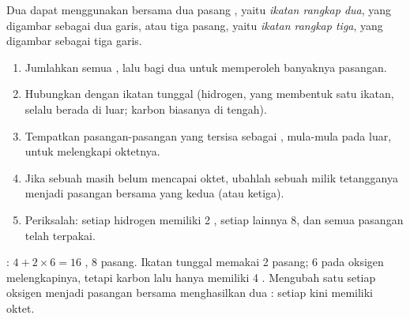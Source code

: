 \begin{definition}\label{def:g10:lewis-and-shape:multiple-bond}
Dua  dapat menggunakan bersama dua pasang , yaitu
\emph{ikatan rangkap dua}, yang digambar
sebagai dua garis, atau tiga pasang, yaitu
\emph{ikatan rangkap tiga}, yang digambar
sebagai tiga garis.
\end{definition}

\begin{method}\label{met:g10:lewis-and-shape:draw}
\begin{enumerate}
  \item Jumlahkan  semua , lalu bagi dua untuk
        memperoleh banyaknya pasangan.
  \item Hubungkan  dengan ikatan tunggal (hidrogen, yang membentuk
        satu ikatan, selalu berada di luar; karbon biasanya di tengah).
  \item Tempatkan pasangan-pasangan yang tersisa sebagai ,
        mula-mula pada  luar, untuk melengkapi oktetnya.
  \item Jika sebuah  masih belum mencapai oktet, ubahlah sebuah
         milik  tetangganya menjadi pasangan bersama
        yang kedua (atau ketiga).
  \item Periksalah: setiap hidrogen memiliki 2 , setiap 
        lainnya 8, dan semua pasangan telah terpakai.
\end{enumerate}
\end{method}

\begin{example}\label{ex:g10:lewis-and-shape:co2}
: $4 + 2 \times 6 = 16$ , 8 pasang. Ikatan
tunggal  memakai 2 pasang; 6  pada 
oksigen melengkapinya, tetapi karbon lalu hanya memiliki 4 .
Mengubah satu  setiap oksigen menjadi pasangan bersama
menghasilkan dua : setiap  kini memiliki oktet.
\end{example}

